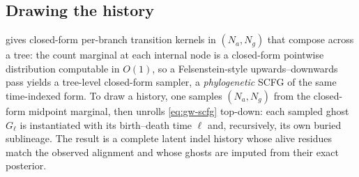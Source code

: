 \documentclass{article}
\begin{document}
\subsection{Drawing the history}
 gives closed-form per-branch transition kernels
in $(N_a,N_g)$ that compose across a tree: the count marginal at each
internal node is a closed-form pointwise distribution computable in
$O(1)$, so a Felsenstein-style upwards--downwards pass yields a
tree-level closed-form sampler, a \emph{phylogenetic} SCFG of the same
time-indexed form. To draw a history, one samples $(N_a,N_g)$ from the
closed-form midpoint marginal, then unrolls \eqref{eq:gw-scfg} top-down:
each sampled ghost $G_\ell$ is instantiated with its birth--death
time $\ell$ and, recursively, its own buried sublineage. The result is a
complete latent indel history whose alive residues match the observed
alignment and whose ghosts are imputed from their exact posterior.
\end{document}
